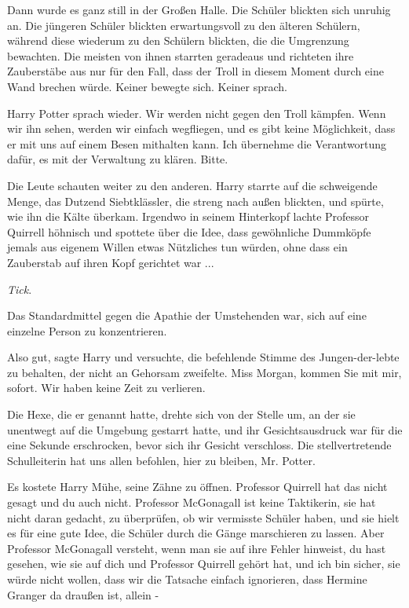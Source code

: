 Dann wurde es ganz still in der Großen Halle. Die Schüler blickten sich unruhig
an. Die jüngeren Schüler blickten erwartungsvoll zu den älteren Schülern,
während diese wiederum zu den Schülern blickten, die die Umgrenzung bewachten.
Die meisten von ihnen starrten geradeaus und richteten ihre Zauberstäbe aus nur
für den Fall, dass der Troll in diesem Moment durch eine Wand brechen würde.
Keiner bewegte sich. Keiner sprach.

Harry Potter sprach wieder. \glqq{}Wir werden nicht gegen den Troll kämpfen. Wenn
wir ihn sehen, werden wir einfach wegfliegen, und es gibt keine Möglichkeit,
dass er mit uns auf einem Besen mithalten kann. Ich übernehme die Verantwortung
dafür, es mit der Verwaltung zu klären. Bitte.\grqq{}

Die Leute schauten weiter zu den anderen. Harry starrte auf die schweigende
Menge, das Dutzend Siebtklässler, die streng nach außen blickten, und spürte,
wie ihn die Kälte überkam. Irgendwo in seinem Hinterkopf lachte Professor
Quirrell höhnisch und spottete über die Idee, dass gewöhnliche Dummköpfe jemals
aus eigenem Willen etwas Nützliches tun würden, ohne dass ein Zauberstab auf
ihren Kopf gerichtet war ...

\emph{Tick}.

Das Standardmittel gegen die Apathie der Umstehenden war, sich auf eine einzelne
Person zu konzentrieren.

\glqq{}Also gut\grqq{}, sagte Harry und versuchte, die befehlende Stimme des
Jungen-der-lebte zu behalten, der nicht an Gehorsam zweifelte. \glqq{}Miss
Morgan, kommen Sie mit mir, sofort. Wir haben keine Zeit zu verlieren.\grqq{}

Die Hexe, die er genannt hatte, drehte sich von der Stelle um, an der sie
unentwegt auf die Umgebung gestarrt hatte, und ihr Gesichtsausdruck war für die
eine Sekunde erschrocken, bevor sich ihr Gesicht verschloss. \glqq{}Die
stellvertretende Schulleiterin hat uns allen befohlen, hier zu bleiben, Mr.
Potter.\grqq{}

Es kostete Harry Mühe, seine Zähne zu öffnen. \glqq{}Professor Quirrell hat das
nicht gesagt und du auch nicht. Professor McGonagall ist keine Taktikerin, sie
hat nicht daran gedacht, zu überprüfen, ob wir vermisste Schüler haben, und sie
hielt es für eine gute Idee, die Schüler durch die Gänge marschieren zu lassen.
Aber Professor McGonagall versteht, wenn man sie auf ihre Fehler hinweist, du
hast gesehen, wie sie auf dich und Professor Quirrell gehört hat, und ich bin
sicher, sie würde nicht wollen, dass wir die Tatsache einfach ignorieren, dass
Hermine Granger da draußen ist, allein -\grqq{}

